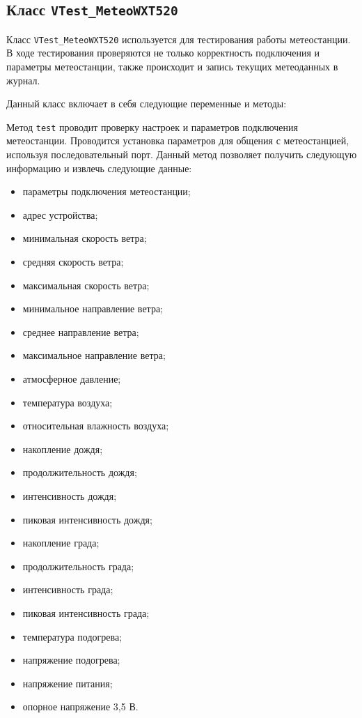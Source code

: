 \subsection{Класс \texttt{VTest\_MeteoWXT520}}
Класс \texttt{VTest\_MeteoWXT520} используется для тестирования работы метеостанции. В ходе тестирования проверяются не
только корректность подключения и параметры метеостанции, также происходит и запись текущих метеоданных в журнал.

Данный класс включает в себя следующие переменные и методы:
\begin{enum}
	\item Метод \texttt{test} проводит проверку настроек и параметров подключения метеостанции. Проводится установка
		параметров для общения с метеостанцией, используя последовательный порт. Данный метод позволяет получить
		следующую информацию и извлечь следующие данные:
		\begin{itemize}
			\item параметры подключения метеостанции;
			\item адрес устройства;
			\item минимальная скорость ветра;
			\item средняя скорость ветра;
			\item максимальная скорость ветра;
			\item минимальное направление ветра;
			\item среднее направление ветра;
			\item максимальное направление ветра;
			\item атмосферное давление;
			\item температура воздуха;
			\item относительная влажность воздуха;
			\item накопление дождя;
			\item продолжительность дождя;
			\item интенсивность дождя;
			\item пиковая интенсивность дождя;
			\item накопление града;
			\item продолжительность града;
			\item интенсивность града;
			\item пиковая интенсивность града;
			\item температура подогрева;
			\item напряжение подогрева;
			\item напряжение питания;
			\item опорное напряжение 3,5 В.

\end{itemize}
\end{enum}
